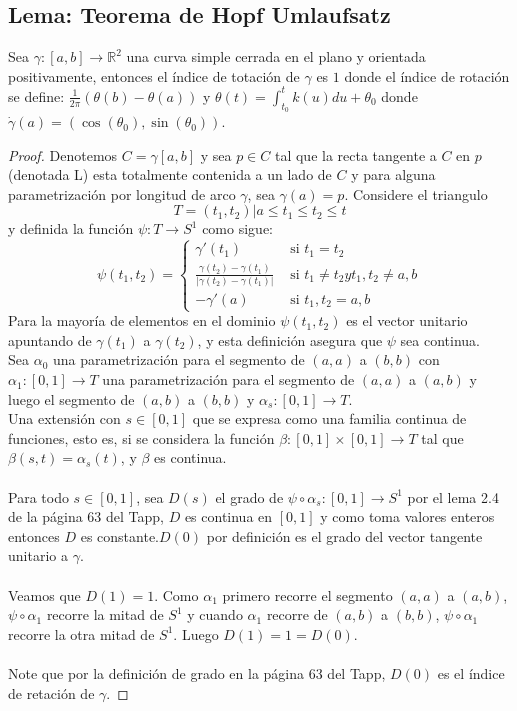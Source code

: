 \documentclass[12pt]{article}
\begin{document}
\subsection*{Lema: Teorema de Hopf Umlaufsatz}
Sea $\gamma:[a,b]\rightarrow \mathbb{R}^2$ una curva simple cerrada en el plano y orientada positivamente, entonces el \'indice de totaci\'on de $\gamma$ es $1$ donde el \'indice de rotaci\'on se define: $\frac{1}{2\pi}(\theta(b)-\theta(a))$ y $\theta(t)=\int_{t_{0}}^{t} k(u) du + \theta_{0}$ donde $\dot{\gamma}(a)=(\cos (\theta_{0}), \sin (\theta_{0}))$. %
\begin{proof}
Denotemos $C = \gamma[a,b]$ y sea  $p \in C$ tal que la recta tangente a $C$ en $p$ (denotada L) esta totalmente contenida a un lado de $C$ y para alguna parametrizaci\'on por longitud de arco $\gamma$, sea $\gamma(a)=p$. Considere el triangulo
\begin{equation*}
T={(t_{1}, t_{2})| a \leq t_{1} \leq t_{2} \leq t}
\end{equation*}
y definida la funci\'on $\psi:T \rightarrow S^{1}$ como sigue:
\begin{equation*}
\psi(t_{1},t_{2})=\begin{cases}
\gamma'(t_{1}) & \text{ si } t_{1}=t_{2}\\
\frac{\gamma(t_{2})-\gamma(t_{1})}{|\gamma(t_{2})-\gamma(t_{1})|} & \text{ si } t_{1} \neq t_{2} y {t_{1},t_{2}} \neq {a,b}\\
-\gamma'(a) & \text{ si } {t_{1},t_{2}}={a,b}
\end{cases}
\end{equation*}
Para la mayor\'ia de elementos en el dominio $\psi(t_{1},t_{2})$ es el vector unitario apuntando de $\gamma(t_{1})$ a $\gamma(t_{2})$, y esta definici\'on asegura que $\psi$ sea continua.
\\
Sea $\alpha_{0}$ una parametrizaci\'on para el segmento de $(a,a)$ a $(b,b)$ con $\alpha _{1}:[0,1] \rightarrow T$ una parametrizaci\'on para el segmento de $(a,a)$ a $(a,b)$ y luego el segmento de $(a,b)$ a $(b,b)$ y $\alpha_{s}:[0,1] \rightarrow T$.\\
Una extensi\'on con $s \in [0,1]$ que se expresa como una familia continua de funciones, esto es, si se considera la funci\'on $\beta:[0,1]\times[0,1] \rightarrow T$ tal que $\beta(s,t)=\alpha_{s}(t)$, y $\beta$ es continua.\\
\\
Para todo $s \in [0,1]$, sea $D(s)$ el grado de $\psi \circ \alpha_{s}:[0,1] \rightarrow S^{1}$ por el lema 2.4 de la p\'agina 63 del Tapp, $D$ es continua en $[0,1]$ y como toma valores enteros entonces $D$ es constante.$D(0)$ por definici\'on es el grado del vector tangente unitario a $\gamma$.\\
\\
Veamos que $D(1)=1$. Como $\alpha_{1}$ primero recorre el segmento $(a,a)$ a $(a,b)$, $\psi \circ \alpha_{1}$ recorre la mitad de $S^{1}$ y cuando $\alpha_{1}$ recorre de $(a,b)$ a $(b,b)$, $\psi \circ \alpha_{1}$ recorre la otra mitad de $S^{1}$. Luego $D(1)=1=D(0)$.\\
\\
Note que por la definici\'on de grado en la p\'agina 63 del Tapp, $D(0)$ es el \'indice de retaci\'on de $\gamma$.


\end{proof}
\end{document}
